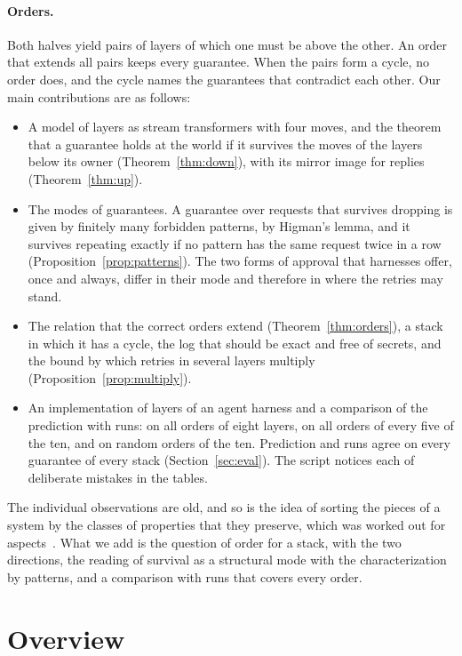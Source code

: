 \documentclass[acmsmall,nonacm,screen]{acmart}
\begin{document}
\paragraph{Orders.} Both halves yield pairs of layers of which one must be above the other.
An order that extends all pairs keeps every guarantee. When the pairs form a cycle, no order
does, and the cycle names the guarantees that contradict each other. Our main contributions
are as follows:
\begin{itemize}
\item A model of layers as stream transformers with four moves, and the theorem that a
  guarantee holds at the world if it survives the moves of the layers below its owner
  (Theorem~\ref{thm:down}), with its mirror image for replies (Theorem~\ref{thm:up}).
\item The modes of guarantees. A guarantee over requests that survives dropping is given by
  finitely many forbidden patterns, by Higman's lemma, and it survives repeating exactly if
  no pattern has the same request twice in a row (Proposition~\ref{prop:patterns}). The
  two forms of approval that harnesses offer, once and always, differ in their mode and
  therefore in where the retries may stand.
\item The relation that the correct orders extend (Theorem~\ref{thm:orders}), a stack in
  which it has a cycle, the log that should be exact and free of secrets, and the bound by
  which retries in several layers multiply (Proposition~\ref{prop:multiply}).
\item An implementation of \exLayers{} layers of an agent harness and a comparison of the
  prediction with runs: on all \exEightOrders{} orders of eight layers, on all orders of
  every five of the ten, and on random orders of the ten. Prediction and runs agree on
  every guarantee of every stack (Section~\ref{sec:eval}). The script notices each of
  \exMutants{} deliberate mistakes in the tables.
\end{itemize}

The individual observations are old, and so is the idea of sorting the pieces of a system by
the classes of properties that they preserve, which was worked out for
aspects~\cite{katz2006,djoko2012}. What we add is the question of order for a stack, with
the two directions, the reading of survival as a structural mode with the characterization by
patterns, and a comparison with runs that covers every order.

\section{Overview}
\label{sec:overview}
\end{document}
